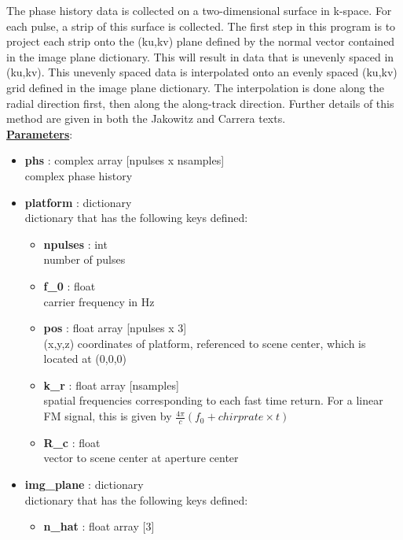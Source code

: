 \documentclass{article}
\newcommand{\defs}[2]{\textbf{{#1}} : {#2}}
\begin{document}
The phase history data is collected on a two-dimensional surface in k-space.  For each pulse, a strip of this surface is collected.  The first step in this program is to project each strip onto the (ku,kv) plane defined by the normal vector contained in the image plane dictionary.  This will result in data that is unevenly spaced in (ku,kv). This unevenly spaced data is interpolated onto an evenly spaced (ku,kv) grid defined in the image plane dictionary.  The interpolation is done along the radial direction first, then along the along-track direction.  Further details of this method are given in both the Jakowitz and Carrera texts.\\

\noindent \underline{\textbf{Parameters}}:

\begin{itemize}
	\item \defs{phs}{complex array [npulses x nsamples]}\\
  	complex phase history
  	\item \defs{platform}{dictionary}\\
  	dictionary that has the following keys defined:
	\begin{itemize}
	    \item \defs{npulses}{int}\\
	    	number of pulses
	    \item \defs{f\_0}{float}\\
	    	carrier frequency in Hz
	    \item \defs{pos}{float array [npulses x 3]}\\
	       	(x,y,z) coordinates of platform, referenced to scene center, which is located at (0,0,0)
	    \item\defs{k\_r}{float array [nsamples]}\\
	    	spatial frequencies corresponding to each fast time return.  For a linear FM signal, this is given by $\frac{4\pi}{c}(f_0+chirprate\times t)$
	    \item\defs{R\_c}{float}\\
	    	vector to scene center at aperture center
	\end{itemize}
  	\item \defs{img\_plane}{dictionary}\\
  	dictionary that has the following keys defined:
	\begin{itemize}
	    \item \defs{n\_hat}{float array [3]}\\

\end{itemize}
\end{itemize}
\end{document}
